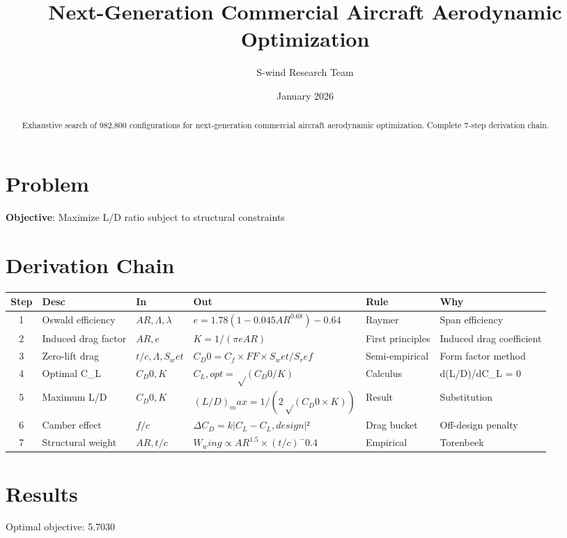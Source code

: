 \documentclass[11pt]{article}
\title{Next-Generation Commercial Aircraft Aerodynamic Optimization}
\author{S-wind Research Team}
\date{January 2026}
\begin{document}
\maketitle

\begin{abstract}
Exhaustive search of 982,800 configurations for next-generation commercial aircraft aerodynamic optimization. Complete 7-step derivation chain.
\end{abstract}

\section{Problem}
\textbf{Objective}: Maximize L/D ratio subject to structural constraints

\section{Derivation Chain}
\begin{longtable}{|c|p{2cm}|p{2cm}|p{3cm}|p{2cm}|p{3cm}|}
\hline
Step & Desc & In & Out & Rule & Why\\\hline\endhead
1 & Oswald efficiency & $AR, Λ, λ$ & $e = 1.78(1-0.045AR^0.68)-0.64$ & Raymer & Span efficiency\\\hline
2 & Induced drag factor & $AR, e$ & $K = 1/(πeAR)$ & First principles & Induced drag coefficient\\\hline
3 & Zero-lift drag & $t/c, Λ, S_wet$ & $C_D0 = C_f×FF×S_wet/S_ref$ & Semi-empirical & Form factor method\\\hline
4 & Optimal C\_L & $C_D0, K$ & $C_L,opt = √(C_D0/K)$ & Calculus & d(L/D)/dC\_L = 0\\\hline
5 & Maximum L/D & $C_D0, K$ & $(L/D)_max = 1/(2√(C_D0×K))$ & Result & Substitution\\\hline
6 & Camber effect & $f/c$ & $ΔC_D = k|C_L - C_L,design|²$ & Drag bucket & Off-design penalty\\\hline
7 & Structural weight & $AR, t/c$ & $W_wing ∝ AR^1.5 × (t/c)^-0.4$ & Empirical & Torenbeek\\\hline
\end{longtable}

\section{Results}
Optimal objective: 5.7030
\end{document}

